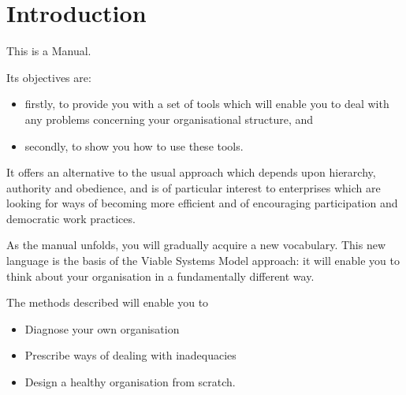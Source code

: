 \chapter{Introduction}
This is a Manual.\par
Its objectives are:
\begin{itemize}
	\item firstly, to provide you with a set of tools which will enable you to deal with any problems concerning your organisational structure, and
	\item secondly, to show you how to use these tools.
\end{itemize}
It offers an alternative to the usual approach which depends upon hierarchy, authority and obedience, and is of particular interest to enterprises which are looking for ways of becoming more efficient and of encouraging participation and democratic work practices.

As the manual unfolds, you will gradually acquire a new vocabulary. This new language is the basis of the Viable Systems Model approach: it will enable you to think about your organisation in a fundamentally different way.

The methods described will enable you to

\begin{itemize}
	\item Diagnose your own organisation

	\item Prescribe ways of dealing with inadequacies

	\item Design a healthy organisation from scratch.
\end{itemize}